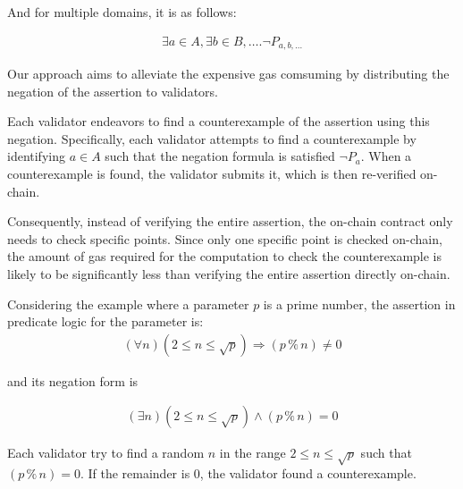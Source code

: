 \documentclass[runningheads]{llncs}
\begin{document}
And for multiple domains, it is as follows:

\begin{gather}
\label{eq:4}
\exists a \in A, \exists b \in B, \dots. \neg P_{a, b, \dots}
\end{gather}



Our approach aims to alleviate the expensive gas comsuming by distributing the negation of the assertion to validators. 

Each validator endeavors to find a counterexample of the assertion using this negation. Specifically, each validator attempts to find a counterexample by identifying $a \in A$ such that the negation formula is satisfied $\neg P_{a}$. When a counterexample is found, the validator submits it, which is then re-verified on-chain. 

Consequently, instead of verifying the entire assertion, the on-chain contract only needs to check specific points. Since only one specific point is checked on-chain, the amount of gas required for the computation to check the counterexample is likely to be significantly less than verifying the entire assertion directly on-chain.


 
Considering the example where a parameter $p$ is a prime number, the assertion in predicate logic for the parameter is:
\begin{gather}\label{eq:3a}
  (\forall n) (2 \le n \le \sqrt p) \Rightarrow (p \mathbin{\%} n) \ne 0
\end{gather}


\noindent and its negation form is 

\begin{gather}\label{eq:3b}
  (\exists n) (2 \le n \le \sqrt p) \wedge (p \mathbin{\%} n) = 0
\end{gather}

Each validator try to find  a
random $n$ in the range $2 \le n \le 
\sqrt p$ such that $(p \mathbin{\%} n) = 0$. If the remainder is $0$, the validator found a counterexample.
\end{document}
